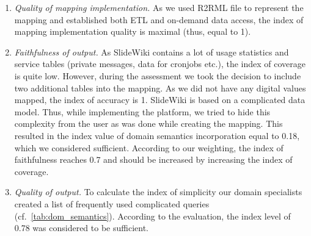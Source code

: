\documentclass[ngerman,UKenglish,table]{scrbook}
\begin{document}
\begin{enumerate} 

\item{\emph{Quality of mapping implementation.}}
As we used R2RML file to represent the mapping and established both ETL and on-demand data access, the index of mapping implementation quality is maximal (thus, equal to 1).

\item{\emph{Faithfulness of output.}}
As SlideWiki contains a lot of usage statistics and service tables (private messages, data for cronjobs etc.), the index of coverage is quite low.
However, during the assessment we took the decision to include two additional tables into the mapping.
As we did not have any digital values mapped, the index of accuracy is 1.
SlideWiki is based on a complicated data model.
Thus, while implementing the platform, we tried to hide this complexity from the user as was done while creating the mapping.
This resulted in the index value of domain semantics incorporation equal to 0.18, which we considered sufficient.
According to our weighting, the index of faithfulness reaches 0.7 and should be increased by increasing the index of coverage. 

\item{\emph{Quality of output.}}
To calculate the index of simplicity our domain specialists created a list of frequently used complicated queries (cf.~\autoref{tab:dom_semantics}).
According to the evaluation, the index level of 0.78 was considered to be sufficient.

\begin{table}[!ht]
\centering

\begin{tabular}{p{0.7\linewidth}|p{0.14\linewidth}}


\end{tabular}
\end{table}
\end{enumerate}
\end{document}

